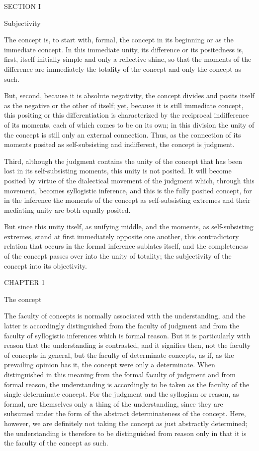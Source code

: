 SECTION I

Subjectivity

The concept is, to start with, formal,
the concept in its beginning
or as the immediate concept.
In this immediate unity,
its difference or its positedness
is, first, itself initially simple
and only a reflective shine,
so that the moments of the difference
are immediately the totality of the concept
and only the concept as such.

But, second, because it is absolute negativity,
the concept divides and posits itself
as the negative or the other of itself;
yet, because it is still immediate concept,
this positing or this differentiation is
characterized by the reciprocal
indifference of its moments,
each of which comes to be on its own;
in this division the unity of the concept is
still only an external connection.
Thus, as the connection of its moments
posited as self-subsisting and indifferent,
the concept is judgment.

Third, although the judgment contains
the unity of the concept that has been lost
in its self-subsisting moments,
this unity is not posited.
It will become posited by virtue of
the dialectical movement of the judgment
which, through this movement,
becomes syllogistic inference,
and this is the fully posited concept,
for in the inference the moments of
the concept as self-subsisting extremes
and their mediating unity are both equally posited.

But since this unity itself, as unifying middle,
and the moments, as self-subsisting extremes,
stand at first immediately opposite one another,
this contradictory relation that occurs
in the formal inference sublates itself,
and the completeness of the concept passes over
into the unity of totality;
the subjectivity of the concept
into its objectivity.

CHAPTER 1

The concept

The faculty of concepts is normally
associated with the understanding,
and the latter is accordingly distinguished
from the faculty of judgment
and from the faculty of syllogistic inferences
which is formal reason.
But it is particularly with reason
that the understanding is contrasted,
and it signifies then, not the faculty of concepts in general,
but the faculty of determinate concepts,
as if, as the prevailing opinion has it,
the concept were only a determinate.
When distinguished in this meaning
from the formal faculty of judgment and from formal reason,
the understanding is accordingly to be taken
as the faculty of the single determinate concept.
For the judgment and the syllogism or reason, as formal,
are themselves only a thing of the understanding,
since they are subsumed under the form
of the abstract determinateness of the concept.
Here, however, we are definitely not taking
the concept as just abstractly determined;
the understanding is therefore
to be distinguished from reason only
in that it is the faculty of the concept as such.

